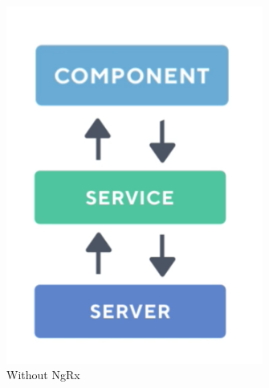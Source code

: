 \paragraph{}

\begin{figure}[h!]
    \centering  
    \caption{Without NgRx}
    \includegraphics[scale=0.5]{img/cap2/without-ngrx}
\end{figure}
\paragraph{}

